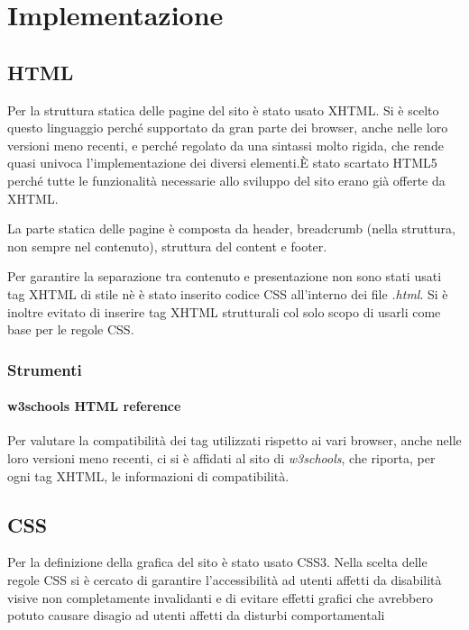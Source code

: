 \section{Implementazione}
\label{implementazione}

\subsection{HTML}
\label{implementazione-html}
Per la struttura statica delle pagine del sito è stato usato XHTML. Si è scelto questo linguaggio perché supportato da gran parte dei browser, anche nelle loro versioni meno recenti, e perché regolato da una sintassi molto rigida, che rende quasi univoca l'implementazione dei diversi elementi.È stato scartato HTML5 perché tutte le funzionalità necessarie allo sviluppo del sito erano già offerte da XHTML.

La parte statica delle pagine è composta da header, breadcrumb (nella struttura, non sempre nel contenuto), struttura del content e footer.

Per garantire la separazione tra contenuto e presentazione non sono stati usati tag XHTML di stile nè è stato inserito codice CSS all'interno dei file \textit{.html}. Si è inoltre evitato di inserire tag XHTML strutturali col solo scopo di usarli come base per le regole CSS. 

\subsubsection{Strumenti}
\label{implementazione-html-strumenti}

\paragraph{w3schools HTML reference}
\label{implementazione-html-strumenti-w3schools-reference}
Per valutare la compatibilità dei tag utilizzati rispetto ai vari browser, anche nelle loro versioni meno recenti, ci si è affidati al sito di \textit{w3schools}, che riporta, per ogni tag XHTML, le informazioni di compatibilità.


\subsection{CSS}
\label{implementazione-css}
Per la definizione della grafica del sito è stato usato CSS3. Nella scelta delle regole CSS si è cercato di garantire l'accessibilità ad utenti affetti da disabilità visive non completamente invalidanti e di evitare effetti grafici che avrebbero potuto causare disagio ad utenti affetti da disturbi comportamentali

